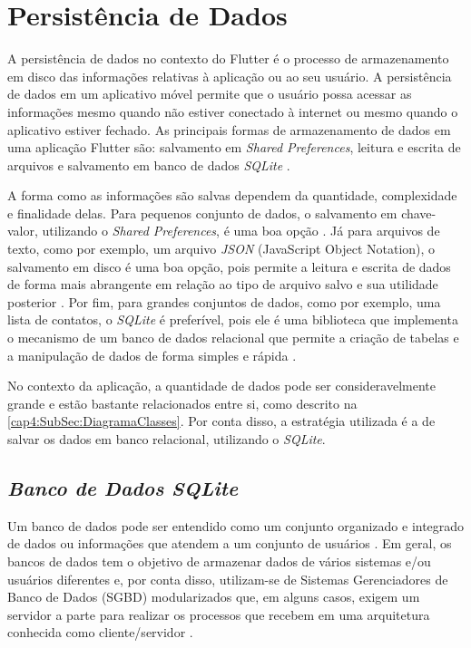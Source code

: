 


\section{Persistência de Dados}
\label{cap2:Sec:PersistenciaDados}
A persistência de dados no contexto do Flutter é o processo de armazenamento em disco das informações relativas à aplicação ou ao seu usuário. A persistência de dados em um aplicativo móvel permite que o usuário possa acessar as informações mesmo quando não estiver conectado à internet ou mesmo quando o aplicativo estiver fechado. As principais formas de armazenamento de dados em uma aplicação Flutter são: salvamento em \textit{Shared Preferences}, leitura e escrita de arquivos e salvamento em banco de dados \textit{SQLite} \cite{persistence}.

A forma como as informações são salvas dependem da quantidade, complexidade e finalidade delas. Para pequenos conjunto de dados, o salvamento em chave-valor, utilizando o \textit{Shared Preferences}, é uma boa opção \cite{shared_preferences}. Já para arquivos de texto, como por exemplo, um arquivo \textit{JSON} (JavaScript Object Notation), o salvamento em disco é uma boa opção, pois permite a leitura e escrita de dados de forma mais abrangente em relação ao tipo de arquivo salvo e sua utilidade posterior \cite{reading_writing_files}. Por fim, para grandes conjuntos de dados, como por exemplo, uma lista de contatos, o \textit{SQLite} é preferível, pois ele é uma biblioteca que implementa o mecanismo de um banco de dados relacional \cite{sqlite-org} que permite a criação de tabelas e a manipulação de dados de forma simples e rápida \cite{sqlite-flutter} \cite{sqlite_features}.

No contexto da aplicação, a quantidade de dados pode ser consideravelmente grande e estão bastante relacionados entre si, como descrito na \ref{cap4:SubSec:DiagramaClasses}. Por conta disso, a estratégia utilizada é a de salvar os dados em banco relacional, utilizando o \textit{SQLite}.

\subsection{\textit{Banco de Dados SQLite}}
\label{cap2:SubSec:BancoSQLite}
Um banco de dados pode ser entendido como um conjunto organizado e integrado de dados ou informações que atendem a um conjunto de usuários \cite{heuser09banco} \cite{oracle}. Em geral, os bancos de dados tem o objetivo de armazenar dados de vários sistemas e/ou usuários diferentes e, por conta disso, utilizam-se de Sistemas Gerenciadores de Banco de Dados (SGBD) modularizados \cite{heuser09banco} que, em alguns casos, exigem um servidor a parte para realizar os processos que recebem em uma arquitetura conhecida como cliente/servidor \cite{sqlitetutorial_net}.

